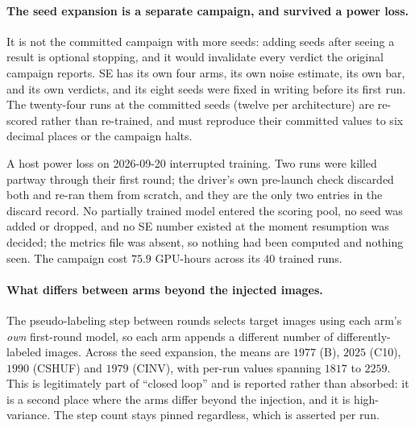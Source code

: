 \documentclass{article}
\begin{document}
\paragraph{The seed expansion is a separate campaign, and survived a power loss.} It is not the
committed campaign with more seeds: adding seeds after seeing a result is optional stopping, and it
would invalidate every verdict the original campaign reports. SE has its own four arms, its own
noise estimate, its own bar, and its own verdicts, and its eight seeds were fixed in writing before
its first run. The twenty-four runs at the committed seeds (twelve per architecture) are re-scored rather than re-trained, and must
reproduce their committed values to six decimal places or the campaign halts.

A host power loss on 2026-09-20 interrupted training. Two runs were killed partway through their
first round; the driver's own pre-launch check discarded both and re-ran them from scratch, and they
are the only two entries in the discard record. No partially trained model entered the scoring pool,
no seed was added or dropped, and no SE number existed at the moment resumption was decided; the
metrics file was absent, so nothing had been computed and nothing seen. The campaign cost $75.9$
GPU-hours across its $40$ trained runs.

\paragraph{What differs between arms beyond the injected images.} The pseudo-labeling step between
rounds selects target images using each arm's \emph{own} first-round model, so each arm appends a
different number of differently-labeled images. Across the seed expansion, the means are $1977$ (B),
$2025$ (C10), $1990$ (CSHUF) and $1979$ (CINV), with per-run values spanning $1817$ to $2259$. This
is legitimately part of ``closed loop'' and is reported rather than absorbed: it is a second place where the arms differ beyond the injection, and it is high-variance. The step count stays pinned
regardless, which is asserted per run.
\end{document}
